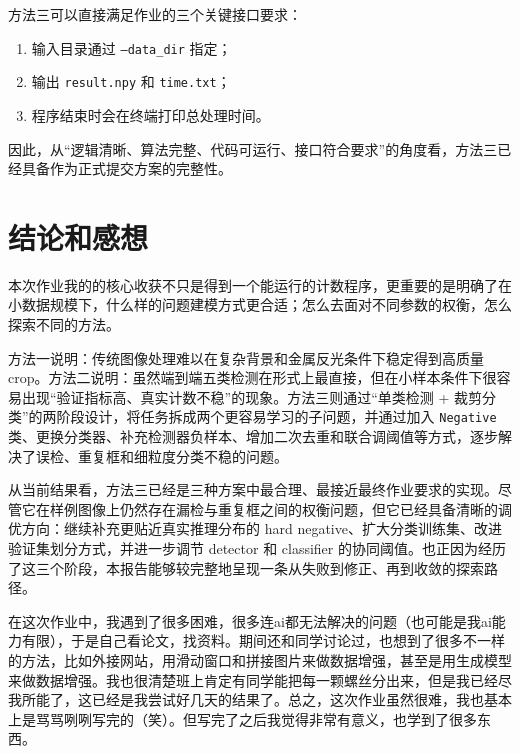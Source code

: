\documentclass[12pt,a4paper]{ctexart}
\begin{document}
方法三可以直接满足作业的三个关键接口要求：
\begin{enumerate}
    \item 输入目录通过 \texttt{--data\_dir} 指定；
    \item 输出 \texttt{result.npy} 和 \texttt{time.txt}；
    \item 程序结束时会在终端打印总处理时间。
\end{enumerate}

因此，从“逻辑清晰、算法完整、代码可运行、接口符合要求”的角度看，方法三已经具备作为正式提交方案的完整性。

\section{结论和感想}

本次作业我的的核心收获不只是得到一个能运行的计数程序，更重要的是明确了在小数据规模下，什么样的问题建模方式更合适；怎么去面对不同参数的权衡，怎么探索不同的方法。

方法一说明：传统图像处理难以在复杂背景和金属反光条件下稳定得到高质量 crop。方法二说明：虽然端到端五类检测在形式上最直接，但在小样本条件下很容易出现“验证指标高、真实计数不稳”的现象。方法三则通过“单类检测 + 裁剪分类”的两阶段设计，将任务拆成两个更容易学习的子问题，并通过加入 \texttt{Negative} 类、更换分类器、补充检测器负样本、增加二次去重和联合调阈值等方式，逐步解决了误检、重复框和细粒度分类不稳的问题。

从当前结果看，方法三已经是三种方案中最合理、最接近最终作业要求的实现。尽管它在样例图像上仍然存在漏检与重复框之间的权衡问题，但它已经具备清晰的调优方向：继续补充更贴近真实推理分布的 hard negative、扩大分类训练集、改进验证集划分方式，并进一步调节 detector 和 classifier 的协同阈值。也正因为经历了这三个阶段，本报告能够较完整地呈现一条从失败到修正、再到收敛的探索路径。

在这次作业中，我遇到了很多困难，很多连ai都无法解决的问题（也可能是我ai能力有限），于是自己看论文，找资料。期间还和同学讨论过，也想到了很多不一样的方法，比如外接网站，用滑动窗口和拼接图片来做数据增强，甚至是用生成模型来做数据增强。我也很清楚班上肯定有同学能把每一颗螺丝分出来，但是我已经尽我所能了，这已经是我尝试好几天的结果了。总之，这次作业虽然很难，我也基本上是骂骂咧咧写完的（笑）。但写完了之后我觉得非常有意义，也学到了很多东西。
\end{document}
